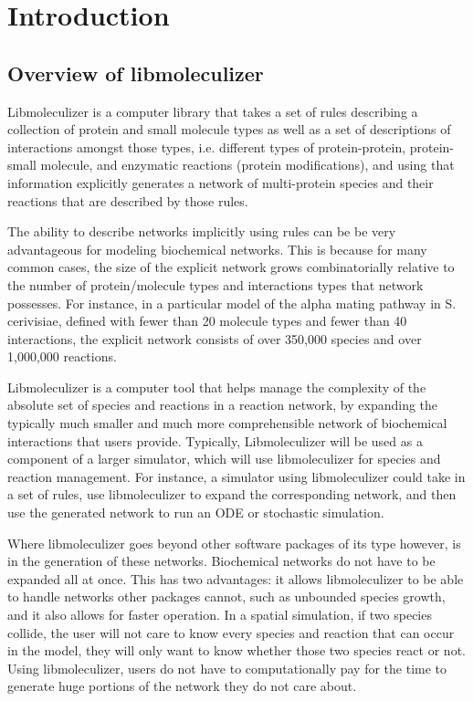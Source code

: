 \chapter{Introduction}
\label{chap:introduction}

\section{Overview of libmoleculizer}
Libmoleculizer is a computer library that takes a set of rules
describing a collection of protein and small molecule types as well as
a set of descriptions of interactions amongst those types,
i.e. different types of protein-protein, protein-small molecule, and
enzymatic reactions (protein modifications), and using that
information explicitly generates a network of multi-protein species
and their reactions that are described by those rules.

The ability to describe networks implicitly using rules can be be
very advantageous for modeling biochemical networks.  This is because
for many common cases, the size of the explicit network grows
combinatorially relative to the number of protein/molecule types and
interactions types that network possesses.  For instance, in a particular
model of the alpha mating pathway in S. cerivisiae, defined
with fewer than 20 molecule types and fewer than 40 interactions, the
explicit network consists of over 350,000 species and over 1,000,000
reactions.

Libmoleculizer is a computer tool that helps manage the complexity of
the absolute set of species and reactions in a reaction network, by
expanding the typically much smaller and much more comprehensible
network of biochemical interactions that users provide.  Typically,
Libmoleculizer will be used as a component of a larger simulator,
which will use libmoleculizer for species and reaction management.
For instance, a simulator using libmoleculizer could take in a set of
rules, use libmoleculizer to expand the corresponding network, and
then use the generated network to run an ODE or stochastic simulation.

Where libmoleculizer goes beyond other software packages of its type
however, is in the generation of these networks.  Biochemical networks
do not have to be expanded all at once.  This has two advantages: it
allows libmoleculizer to be able to handle networks other packages
cannot, such as unbounded species growth, and it also allows for
faster operation.  In a spatial simulation, if two species collide,
the user will not care to know every species and reaction that can
occur in the model, they will only want to know whether those two
species react or not.  Using libmoleculizer, users do not have to
computationally pay for the time to generate huge portions of the
network they do not care about.  

